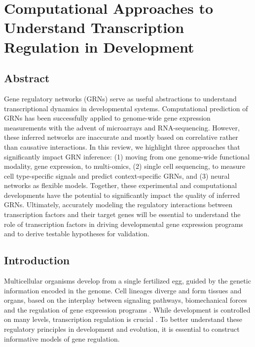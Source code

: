\chapter{Computational Approaches to Understand Transcription Regulation in Development}\thumbforchapter
{}
\newpage
\section{Abstract}

Gene regulatory networks (GRNs) serve as useful abstractions to understand transcriptional dynamics in developmental systems. Computational prediction of GRNs has been successfully applied to genome-wide gene expression measurements with the advent of microarrays and RNA-sequencing. However, these inferred networks are inaccurate and mostly based on correlative rather than causative interactions. In this review, we highlight three approaches that significantly impact GRN inference: (1) moving from one genome-wide functional modality, gene expression, to multi-omics, (2) single cell sequencing, to measure cell type-specific signals and predict context-specific GRNs, and (3) neural networks as flexible models. Together, these experimental and computational developments have the potential to significantly impact the quality of inferred GRNs. Ultimately, accurately modeling the regulatory interactions between transcription factors and their target genes will be essential to understand the role of transcription factors in driving developmental gene expression programs and to derive testable hypotheses for validation.

\section{Introduction}

Multicellular organisms develop from a single fertilized egg, guided by the genetic information encoded in the genome. Cell lineages diverge and form tissues and organs, based on the interplay between signaling pathways, biomechanical forces \cite{Mammoto_2012} and the regulation of gene expression programs \cite{Cameron_1987}. While development is controlled on many levels, transcription regulation is crucial \cite{Cooper2000}. To better understand these regulatory principles in development and evolution, it is essential to construct informative models of gene regulation.

